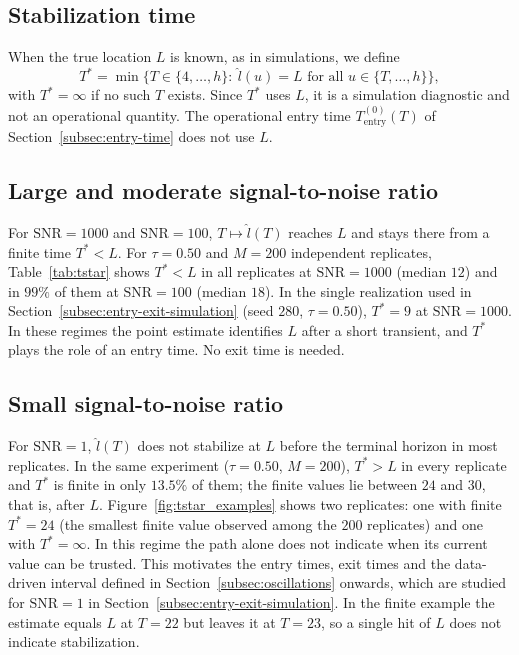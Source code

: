 \documentclass[12pt,a4paper]{article}
\begin{document}
\subsection{Stabilization time}

When the true location $L$ is known, as in simulations, we define
\[
T^{*}
=
\min\{T\in\{4,\dots,h\}:\ \hat l(u)=L \text{ for all } u\in\{T,\dots,h\}\},
\]
with $T^{*}=\infty$ if no such $T$ exists. Since $T^{*}$ uses $L$, it is
a simulation diagnostic and not an operational quantity. The
operational entry time $T_{\mathrm{entry}}^{(0)}(T)$ of
Section~\ref{subsec:entry-time} does not use $L$.

\subsection{Large and moderate signal-to-noise ratio}

For $\mathrm{SNR}=1000$ and $\mathrm{SNR}=100$,
$T\mapsto\hat l(T)$ reaches $L$ and stays there from a finite time
$T^{*}<L$. For $\tau=0.50$ and $M=200$ independent replicates,
Table~\ref{tab:tstar} shows $T^{*}<L$ in all replicates at
$\mathrm{SNR}=1000$ (median $12$) and in $99\%$ of them at
$\mathrm{SNR}=100$ (median $18$). In the single realization used in
Section~\ref{subsec:entry-exit-simulation} (seed $280$, $\tau=0.50$),
$T^{*}=9$ at $\mathrm{SNR}=1000$.
In these regimes the point estimate identifies $L$ after a short transient, and $T^{*}$
plays the role of an entry time. No exit time is needed.

\subsection{Small signal-to-noise ratio}

For $\mathrm{SNR}=1$, $\hat l(T)$ does not stabilize at $L$ before the
terminal horizon in most replicates. In the same experiment ($\tau=0.50$,
$M=200$), $T^{*}>L$ in every replicate and $T^{*}$ is finite in only
$13.5\%$ of them; the finite values lie between $24$ and $30$, that is,
after $L$. Figure~\ref{fig:tstar_examples} shows two replicates: one with
finite $T^{*}=24$ (the smallest finite value observed among the
$200$ replicates) and one with $T^{*}=\infty$. In this regime the path
alone does not indicate when its current value can be trusted. This
motivates the entry times, exit times and the data-driven interval
defined in Section~\ref{subsec:oscillations} onwards, which are studied
for $\mathrm{SNR}=1$ in Section~\ref{subsec:entry-exit-simulation}.
In the finite example the estimate equals $L$ at $T=22$ but leaves it at
$T=23$, so a single hit of $L$ does not indicate stabilization.
\end{document}
